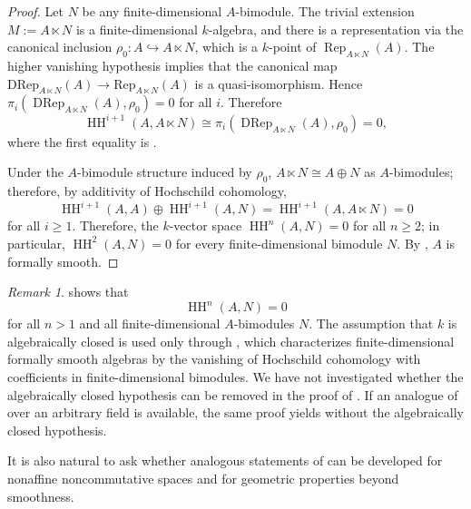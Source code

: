 \documentclass{article}
\numberwithin{equation}{section} %
\theoremstyle{plain}
\theoremstyle{definition}
\theoremstyle{remark}
\newtheorem{remark}{Remark}
\begin{document}
\begin{proof}
Let $N$ be any finite-dimensional $A$-bimodule.
The trivial extension $M:=A\ltimes N$ is a finite-dimensional $k$-algebra, and there is a representation via the canonical inclusion $\rho_0:A\hookrightarrow A\ltimes N$, which is a $k$-point of $\operatorname{Rep}_{A\ltimes N}(A)$.
The higher vanishing hypothesis implies that the canonical map $\mathrm{DRep}_{A\ltimes N}(A)\to\mathrm{Rep}_{A\ltimes N}(A)$ is a quasi-isomorphism.
Hence $\pi_i\left(\operatorname{DRep}_{A\ltimes N}(A),\rho_0\right)=0$ for all $i$.
Therefore
\begin{equation*}
\operatorname{HH}^{i+1}(A,A\ltimes N)\cong\pi_i\left(\operatorname{DRep}_{A\ltimes N}(A),\rho_0\right)=0,
\end{equation*}
where the first equality is .

Under the $A$-bimodule structure induced by $\rho_0$, $A\ltimes N\cong A\oplus N$ as $A$-bimodules; therefore, by additivity of Hochschild cohomology,
\begin{equation*}
\operatorname{HH}^{i+1}(A,A)\oplus\operatorname{HH}^{i+1}(A,N)=\operatorname{HH}^{i+1}(A,A\ltimes N)=0
\end{equation*}
for all $i\geq1$.
Therefore, the $k$-vector space $\operatorname{HH}^n(A,N)=0$ for all $n\ge2$; in particular, $\operatorname{HH}^2(A,N)=0$ for every finite-dimensional bimodule $N$.
By \cite[Theorem 4.6]{AGV16}, $A$ is formally smooth.
\end{proof}

\begin{remark}
 shows that
\begin{equation*}
\operatorname{HH}^n(A,N)=0
\end{equation*}
for all $n>1$ and all finite-dimensional $A$-bimodules $N$.
The assumption that $k$ is algebraically closed is used only through \cite[Theorem 4.6]{AGV16}, which characterizes finite-dimensional formally smooth algebras by the vanishing of Hochschild cohomology with coefficients in finite-dimensional bimodules.
We have not investigated whether the algebraically closed hypothesis can be removed in the proof of \cite[Theorem 4.6]{AGV16}.
If an analogue of \cite[Theorem 4.6]{AGV16} over an arbitrary field is available, the same proof yields  without the algebraically closed hypothesis.
\end{remark}

It is also natural to ask whether analogous statements of  can be developed for nonaffine noncommutative spaces and for geometric properties beyond smoothness.
\end{document}
